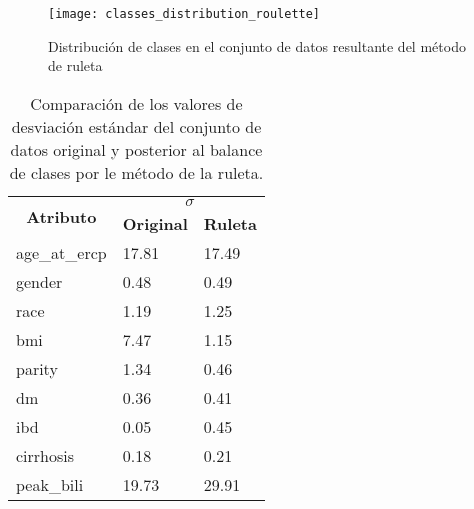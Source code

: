 \begin{figure}[!htb]
	\centering
	\texttt{[image: classes\_distribution\_roulette]}
	\caption{Distribución de clases en el conjunto de datos resultante del método de ruleta}
	\label{Fig: roulette-class}
\end{figure}

\begin{table}[!htb]
\centering
\caption{Comparación de los valores de desviación estándar del conjunto de datos original y posterior al balance de clases por le método de la ruleta.}
\label{Tab: Ruleta-std}
\begin{tabular}{|l|ll|}
\hline
\multicolumn{1}{|c|}{\multirow{2}{*}{\textbf{Atributo}}} & \multicolumn{2}{c|}{\textbf{$\sigma$}}                                           \\ \cline{2-3} 
\multicolumn{1}{|c|}{}                                   & \multicolumn{1}{c|}{\textbf{Original}} & \multicolumn{1}{c|}{\textbf{Ruleta}} \\ \hline
age\_at\_ercp                                            & \multicolumn{1}{l|}{17.81}             & 17.49                                \\ \hline
gender                                                   & \multicolumn{1}{l|}{0.48}              & 0.49                                 \\ \hline
race                                                     & \multicolumn{1}{l|}{1.19}              & 1.25                                 \\ \hline
bmi                                                      & \multicolumn{1}{l|}{7.47}              & 1.15                                 \\ \hline
parity                                                   & \multicolumn{1}{l|}{1.34}              & 0.46                                 \\ \hline
dm                                                       & \multicolumn{1}{l|}{0.36}              & 0.41                                 \\ \hline
ibd                                                      & \multicolumn{1}{l|}{0.05}              & 0.45                                 \\ \hline
cirrhosis                                                & \multicolumn{1}{l|}{0.18}              & 0.21                                 \\ \hline
peak\_bili                                               & \multicolumn{1}{l|}{19.73}             & 29.91                                \\ \hline

\end{tabular}
\end{table}
